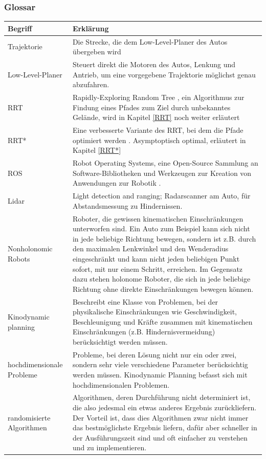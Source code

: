 \subsubsection{Glossar}
\begin{tabularx}{\textwidth}{l|X}
 \textbf{Begriff}  & \textbf{Erklärung}  \\
\hline Trajektorie & Die Strecke, die dem Low-Level-Planer des Autos übergeben wird\\
Low-Level-Planer & Steuert direkt die Motoren des Autos, Lenkung und Antrieb, um eine vorgegebene Trajektorie möglichst genau abzufahren. \\
RRT & Rapidly-Exploring Random Tree \citep{Lav98}, ein Algorithmus zur Findung eines Pfades zum Ziel durch unbekanntes Gelände, wird in Kapitel \ref{RRT} noch weiter erläutert\\
RRT* & Eine verbesserte Variante des RRT, bei dem die Pfade optimiert werden \citep{KaFra10}. Asymptoptisch optimal, erläutert in Kapitel \ref{RRT*} \\
ROS & Robot Operating Systems, eine Open-Source Sammlung an Software-Bibliotheken und Werkzeugen zur Kreation von Anwendungen zur Robotik \citep{ROS}. \\
Lidar & Light detection and ranging; Radarscanner am Auto, für Abstandsmessung zu Hindernissen.\\
Nonholonomic Robots & Roboter, die gewissen kinematischen Einschränkungen unterworfen sind. Ein Auto zum Beispiel kann sich nicht in jede beliebige Richtung bewegen, sondern ist z.B. durch den maximalen Lenkwinkel und den Wenderadius eingeschränkt und kann nicht jeden beliebigen Punkt sofort, mit nur einem Schritt, erreichen. Im Gegensatz dazu stehen holonome Roboter, die sich in jede beliebige Richtung ohne direkte Einschränkungen bewegen können.  \\
Kinodynamic planning & Beschreibt eine Klasse von Problemen, bei der physikalische Einschränkungen wie Geschwindigkeit, Beschleunigung und Kräfte zusammen mit kinematischen Einschränkungen (z.B. Hindernisvermeidung) berücksichtigt werden müssen. \\
hochdimensionale Probleme & Probleme, bei deren Lösung nicht nur ein oder zwei, sondern sehr viele verschiedene Parameter berücksichtig werden müssen. Kinodynamic Planning befasst sich mit hochdimensionalen Problemen.\\
randomisierte Algorithmen & Algorithmen, deren Durchführung nicht determiniert ist, die also jedesmal ein etwas anderes Ergebnis zurückliefern. Der Vorteil ist, dass dies Algorithmen zwar nicht immer das bestmöglichste Ergebnis liefern, dafür aber schneller in der Ausführungszeit sind und oft einfacher zu verstehen und zu implementieren.\\

\end{tabularx}

